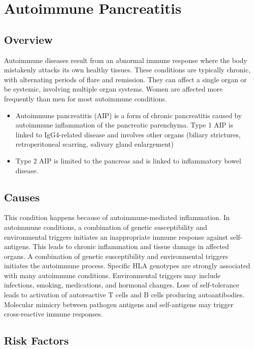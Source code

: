 \chapter{Autoimmune Pancreatitis}
\label{sec:Autoimmune Pancreatitis}

\section{Overview}
Autoimmune diseases result from an abnormal immune response where the body mistakenly attacks its own healthy tissues. These conditions are typically chronic, with alternating periods of flare and remission. They can affect a single organ or be systemic, involving multiple organ systems. Women are affected more frequently than men for most autoimmune conditions.

\begin{itemize}[noitemsep]
  \item Autoimmune pancreatitis (AIP) is a form of chronic pancreatitis caused by autoimmune inflammation of the pancreatic parenchyma. Type 1 AIP is linked to IgG4-related disease and involves other organs (biliary strictures, retroperitoneal scarring, salivary gland enlargement)
  \item Type 2 AIP is limited to the pancreas and is linked to inflammatory bowel disease.
\end{itemize}
\section{Causes}
This condition happens because of autoimmune-mediated inflammation. In autoimmune conditions, a combination of genetic susceptibility and environmental triggers initiates an inappropriate immune response against self-antigens. This leads to chronic inflammation and tissue damage in affected organs. A combination of genetic susceptibility and environmental triggers initiates the autoimmune process. Specific HLA genotypes are strongly associated with many autoimmune conditions. Environmental triggers may include infections, smoking, medications, and hormonal changes. Loss of self-tolerance leads to activation of autoreactive T cells and B cells producing autoantibodies. Molecular mimicry between pathogen antigens and self-antigens may trigger cross-reactive immune responses.
\section{Risk Factors}


